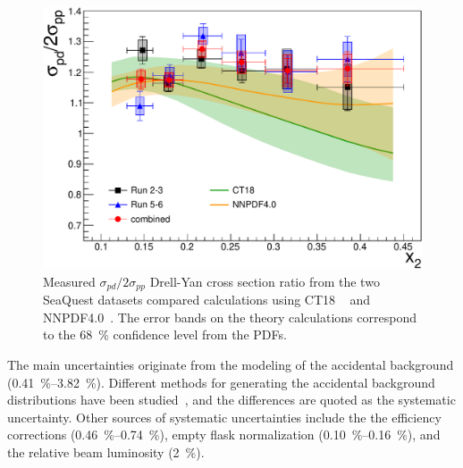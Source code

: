 \documentclass[reprint,aps,unsortedaddress,superscriptaddress,prl,floatfix,showpacs,linenumbers,final]{revtex4-2}
\begin{document}
\begin{figure}[htbp!]
	\centering
	\includegraphics[width=\linewidth]{data_full_xT_syst.pdf}
	\caption{Measured $\sigma_{pd}/2\sigma_{pp}$ Drell-Yan cross section ratio from the two SeaQuest datasets compared calculations using
		CT18 ~\cite{hou2021} and NNPDF4.0~\cite{ball2022a}.
		The error bands on the theory calculations correspond to the \SI{68}{\percent} confidence level from the PDFs.}
	\label{fig:xT_csr}
\end{figure}

The main uncertainties originate from the modeling of the accidental background (\qtyrange{0.41}{3.82}{\percent}).
Different methods for generating the accidental background distributions have been studied~\cite{pate2023},
and the differences are quoted as the systematic uncertainty.
Other sources of systematic uncertainties include the the efficiency corrections (\qtyrange{0.46}{0.74}{\percent}),
empty flask normalization (\qtyrange{0.10}{0.16}{\percent}), and the relative beam luminosity (\SI{2}{\percent}).

\end{document}
